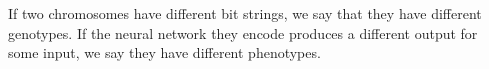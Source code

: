 

%
If two chromosomes have different bit strings, we say that they have different genotypes. If the neural network they encode produces a different output for some input, we say they have different phenotypes.
